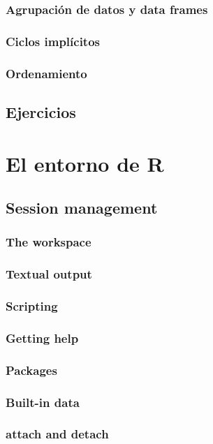 \documentclass[spanish]{extbook}
\numberwithin{equation}{section}
\numberwithin{figure}{section}
\begin{document}
\subsection{Agrupación de datos y data frames}
\subsection{Ciclos implícitos}
\subsection{Ordenamiento}
\section{Ejercicios}

\chapter{El entorno de R}

\section{Session management}
\subsection{The workspace}
\subsection{Textual output}
\subsection{Scripting	}
\subsection{Getting help}
\subsection{Packages}
\subsection{Built-in data}
\subsection{attach and detach}
\end{document}

